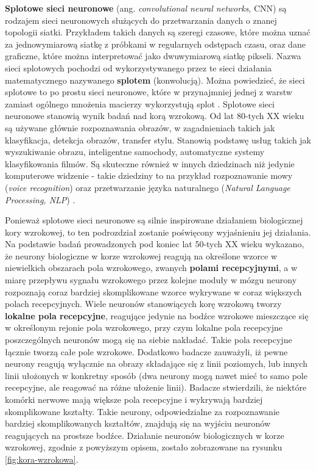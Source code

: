 \documentclass[12pt]{mwbk}
\theoremstyle{plain}
\theoremstyle{definition}
\theoremstyle{remark}
\begin{document}
\textbf{Splotowe sieci neuronowe} (ang. \emph{convolutional neural networks}, CNN) są rodzajem sieci neuronowych służących do przetwarzania danych o znanej topologii siatki. Przykładem takich danych są szeregi czasowe, które można uznać za jednowymiarową siatkę z próbkami w regularnych odstępach czasu, oraz dane graficzne, które można interpretować jako dwuwymiarową siatkę pikseli. Nazwa sieci splotowych pochodzi od wykorzystywanego przez te sieci działania matematycznego nazywanego \textbf{splotem} (konwolucją). Można powiedzieć, że sieci splotowe to po prostu sieci neuronowe, które w przynajmniej jednej z warstw zamiast ogólnego mnożenia macierzy wykorzystują splot \cite{goodfellow}.
Splotowe sieci neuronowe stanowią wynik badań nad korą wzrokową. Od lat 80-tych XX wieku są używane głównie rozpoznawania obrazów, w zagadnieniach takich jak klasyfikacja, detekcja obrazów, transfer stylu. Stanowią podstawę usług takich jak wyszukiwanie obrazu, inteligentne samochody, automatyczne systemy klasyfikowania filmów. Są skuteczne również w innych dziedzinach niż jedynie komputerowe widzenie - takie dziedziny to na przykład rozpoznawanie mowy (\emph{voice recognition}) oraz przetwarzanie języka naturalnego (\emph{Natural Language Processing, NLP}) \cite{geron}. 


Ponieważ splotowe sieci neuronowe są silnie inspirowane działaniem biologicznej kory wzrokowej, to ten podrozdział zostanie poświęcony wyjaśnieniu jej działania. Na podstawie badań prowadzonych pod koniec lat 50-tych XX wieku \cite{hubel1} \cite{hubel2} wykazano, że neurony biologiczne w korze wzrokowej reagują na określone wzorce w niewielkich obszarach pola wzrokowego, zwanych \textbf{polami recepcyjnymi}, a w miarę przepływu sygnału wzrokowego przez kolejne moduły w mózgu neurony rozpoznają coraz bardziej skomplikowane wzorce wykrywane w coraz większych polach recepcyjnych.
Wiele neuronów stanowiących korę wzrokową tworzy \textbf{lokalne pola recepcyjne}, reagujące jedynie na bodźce wzrokowe mieszczące się w określonym rejonie pola wzrokowego, przy czym lokalne pola recepcyjne poszczególnych neuronów mogą się na siebie nakładać. Takie pola recepcyjne łącznie tworzą całe pole wzrokowe. Dodatkowo badacze zauważyli, iż pewne neurony reagują wyłącznie na obrazy składające się z linii poziomych, lub innych linii ułożonych w konkretny sposób (dwa neurony mogą nawet mieć to samo pole recepcyjne, ale reagować na różne ułożenie linii). Badacze stwierdzili, że niektóre komórki nerwowe mają większe pola recepcyjne i wykrywają bardziej skomplikowane kształty. Takie neurony, odpowiedzialne za rozpoznawanie bardziej skomplikowanych kształtów, znajdują się na wyjściu neuronów reagujących na prostsze bodźce. Działanie neuronów biologicznych w korze wzrokowej, zgodnie z powyższym opisem, zostało zobrazowane na rysunku \ref{fig:kora-wzrokowa}.
\end{document}
